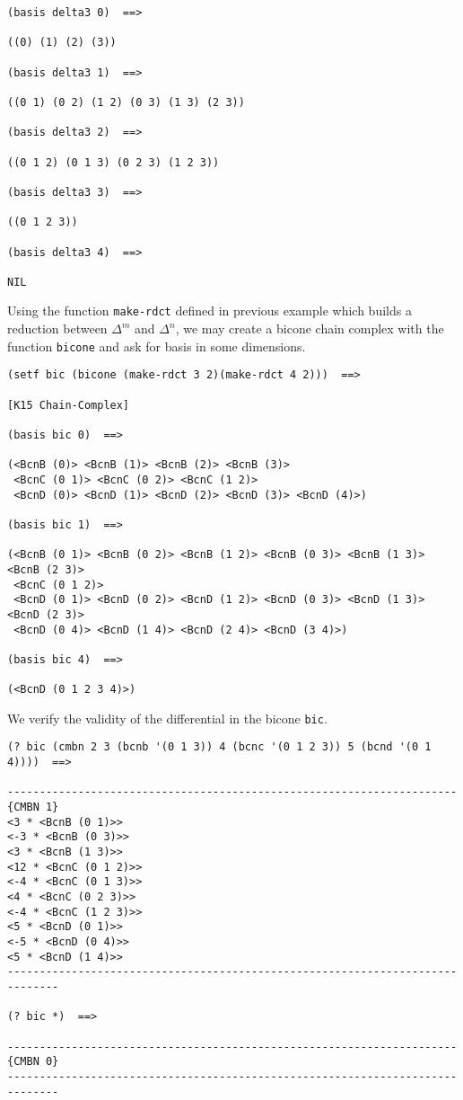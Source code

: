 {{\begin{verbatim}
(basis delta3 0)  ==>

((0) (1) (2) (3))

(basis delta3 1)  ==>

((0 1) (0 2) (1 2) (0 3) (1 3) (2 3))

(basis delta3 2)  ==>

((0 1 2) (0 1 3) (0 2 3) (1 2 3))

(basis delta3 3)  ==>

((0 1 2 3))

(basis delta3 4)  ==>

NIL
\end{verbatim}}
Using the function {\tt make-rdct} defined in previous example which builds a reduction between
$\Delta^m$ and $\Delta^n$, we may
create a bicone chain complex with the function {\tt bicone} and ask for basis in some dimensions.
{\footnotesize\begin{verbatim}
(setf bic (bicone (make-rdct 3 2)(make-rdct 4 2)))  ==>

[K15 Chain-Complex]

(basis bic 0)  ==>

(<BcnB (0)> <BcnB (1)> <BcnB (2)> <BcnB (3)>
 <BcnC (0 1)> <BcnC (0 2)> <BcnC (1 2)>
 <BcnD (0)> <BcnD (1)> <BcnD (2)> <BcnD (3)> <BcnD (4)>)

(basis bic 1)  ==>

(<BcnB (0 1)> <BcnB (0 2)> <BcnB (1 2)> <BcnB (0 3)> <BcnB (1 3)> <BcnB (2 3)>
 <BcnC (0 1 2)>
 <BcnD (0 1)> <BcnD (0 2)> <BcnD (1 2)> <BcnD (0 3)> <BcnD (1 3)> <BcnD (2 3)>
 <BcnD (0 4)> <BcnD (1 4)> <BcnD (2 4)> <BcnD (3 4)>)

(basis bic 4)  ==>

(<BcnD (0 1 2 3 4)>)
\end{verbatim}}
We verify the validity of the differential in the bicone {\tt bic}.
{\footnotesize\begin{verbatim}
(? bic (cmbn 2 3 (bcnb '(0 1 3)) 4 (bcnc '(0 1 2 3)) 5 (bcnd '(0 1 4))))  ==>

----------------------------------------------------------------------{CMBN 1}
<3 * <BcnB (0 1)>>
<-3 * <BcnB (0 3)>>
<3 * <BcnB (1 3)>>
<12 * <BcnC (0 1 2)>>
<-4 * <BcnC (0 1 3)>>
<4 * <BcnC (0 2 3)>>
<-4 * <BcnC (1 2 3)>>
<5 * <BcnD (0 1)>>
<-5 * <BcnD (0 4)>>
<5 * <BcnD (1 4)>>
------------------------------------------------------------------------------

(? bic *)  ==>

----------------------------------------------------------------------{CMBN 0}
------------------------------------------------------------------------------
\end{verbatim}}

}
